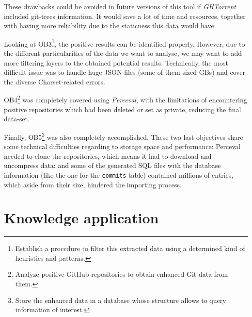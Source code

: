 \documentclass[a4paper, 12pt]{book}
\begin{document}
These drawbacks could be avoided in future versions of this tool if \emph{GHTorrent} included git-trees information. It would save a lot of time and resources,
together with having more reliability due to the staticness this data would have.

Looking at OB3\footnote{Establish a procedure to filter this extracted data using a determined kind of heuristics and patterns.},
the positive results can be identified properly. However, due to the different particularities of the data
we want to analyse, we may want to add more filtering layers to the obtained potential results. Technically,
the most difficult issue was to handle huge JSON files (some of them sized GBs) and cover the diverse Charset-related
errors.

OB4\footnote{Analyze positive GitHub repositories to obtain enhanced Git data from them.}
was completely covered using \emph{Perceval}, with the limitations of encountering positive repositories which had been deleted
or set as private, reducing the final data-set.

Finally, OB5\footnote{Store the enhanced data in a database whose structure allows to query information of interest.}
was also completely accomplished. These two last objectives
share some technical difficulties regarding to storage space and performance: Perceval needed to clone the repositories,
which means it had to download and uncompress data; and some of the generated SQL files with the database information
(like the one for the \texttt{commits} table) contained millions of entries, which aside from their size, hindered
the importing process.

\section{Knowledge application}
\label{sec:knowledge-application}
\end{document}
